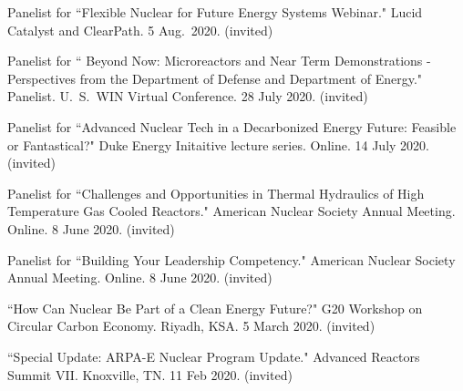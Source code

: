 \begin{bibsection}



\item Panelist for ``Flexible Nuclear for Future Energy
Systems Webinar." Lucid Catalyst and ClearPath. 5 Aug.\ 2020. (invited) 

\item Panelist for `` Beyond Now: Microreactors and Near Term Demonstrations - Perspectives from
the Department of Defense and Department of Energy." Panelist. U.\ S.\ WIN Virtual
Conference. 28 July 2020. (invited) 

\item Panelist for ``Advanced Nuclear Tech in a Decarbonized Energy Future:
Feasible or Fantastical?" Duke Energy Initaitive lecture series.
Online. 14 July 2020. (invited)


\item Panelist for ``Challenges and Opportunities in Thermal
Hydraulics of High Temperature Gas Cooled Reactors." American Nuclear Society Annual Meeting. Online. 8 June 2020. (invited)

\item Panelist for ``Building Your Leadership Competency."
American Nuclear Society Annual Meeting. Online. 8 June 2020. (invited)


\item ``How Can Nuclear Be Part of a Clean Energy Future?" G20
Workshop on Circular Carbon Economy. Riyadh, KSA. 5 March 2020. (invited)

\item ``Special Update: ARPA-E Nuclear Program Update." Advanced Reactors Summit VII. Knoxville, TN. 11 Feb 2020.
(invited)


\end{bibsection}
